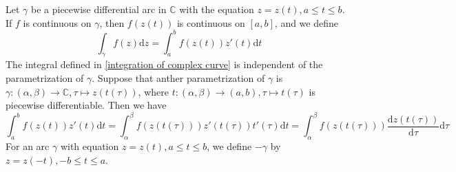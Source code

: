 
Let  $ \gamma $ be a piecewise differential arc in  $ \mathbb{C} $ with the equation  $ z=z(t),a \leq t \leq b $. If  $ f  $ is continuous on  $ \gamma $, then  $ f(z(t)) $ is continuous on  $ [a,b] $, and we define
\begin{equation}
    \int_\gamma f(z)\mathrm{d}z=\int_a^bf(z(t))z'(t)\mathrm{d}t\label{integration of complex curve}
\end{equation}  
The integral defined in \ref{integration of complex curve} is independent of the parametrization of  $ \gamma $. Suppose that anther parametrization of  $ \gamma $ is  $ \gamma:(\alpha,\beta)\rightarrow \mathbb{C} ,\tau\mapsto z(t(\tau))$, where  $ t:(\alpha,\beta)\rightarrow (a,b),\tau\mapsto t(\tau) $ is piecewise differentiable. Then we have
\begin{equation}
    \int_a^b f(z(t))z'(t)\mathrm{d}t=\int_\alpha^\beta f(z(t(\tau)))z'(t(\tau))t'(\tau)\mathrm{d}t=\int_\alpha^\beta f(z(t(\tau)))\frac{\mathrm{d}z(t(\tau))}{\mathrm{d}\tau}\mathrm{d}\tau
\end{equation}
\newline
For an arc  $ \gamma $ with equation  $ z=z(t),a \leq t \leq b $, we define  $ -\gamma $ by  $ z=z(-t),-b \leq t \leq a $.

